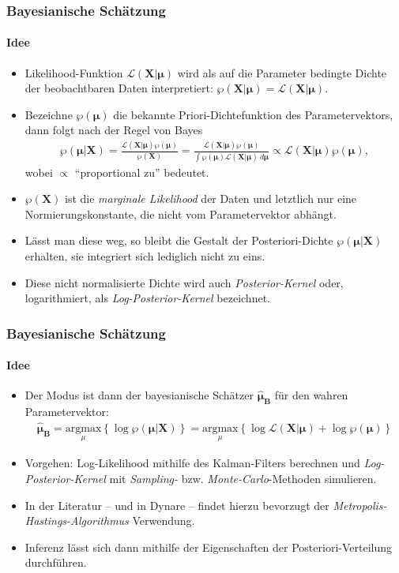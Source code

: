 \documentclass{beamer} %
\begin{document}
\begin{frame}\frametitle{Bayesianische Sch\"{a}tzung}\framesubtitle{Idee}
  \begin{itemize}
     \item Likelihood-Funktion $\mathcal{L}(\mathbf{X}|\boldsymbol{\mu})$ wird als auf die Parameter bedingte Dichte der beobachtbaren Daten interpretiert:
$\wp(\mathbf{X}|\boldsymbol{\mu})=\mathcal{L}(\mathbf{X}|\boldsymbol{\mu})$.
     \item Bezeichne $\wp(\boldsymbol{\mu})$ die bekannte Priori-Dichtefunktion des Parametervektors, dann folgt nach der Regel von Bayes
\begin{align*}
    \wp(\boldsymbol{\mu}|\mathbf{X}) = \frac{\mathcal{L}(\mathbf{X}|\boldsymbol{\mu})\wp(\boldsymbol{\mu})}{\wp(\mathbf{X})} =  \frac{\mathcal{L}(\mathbf{X}|\boldsymbol{\mu})\wp(\boldsymbol{\mu})}{\int \wp(\boldsymbol{\mu}) \mathcal{L}(\mathbf{X|\boldsymbol{\mu}}) ~d\boldsymbol{\mu}} \propto \mathcal{L}(\mathbf{X}|\boldsymbol{\mu})\wp(\boldsymbol{\mu}),
\end{align*}
wobei $\propto$ \enquote{proportional zu} bedeutet.

     \item $\wp(\mathbf{X})$ ist die \emph{marginale Likelihood} der Daten
und letztlich nur eine Normierungskonstante, die nicht vom Parametervektor
abh\"{a}ngt. \item L\"{a}sst man diese weg, so bleibt die Gestalt der Posteriori-Dichte
$\wp(\boldsymbol{\mu}|\mathbf{X})$ erhalten, sie integriert sich lediglich
nicht zu eins. \item Diese nicht normalisierte Dichte wird auch
\emph{Posterior-Kernel} oder, logarithmiert, als \emph{Log-Posterior-Kernel}
bezeichnet.
   \end{itemize}
\end{frame}

\begin{frame}\frametitle{Bayesianische Sch\"{a}tzung}\framesubtitle{Idee}
  \begin{itemize}
    \item Der Modus ist dann der bayesianische Sch\"{a}tzer $\boldsymbol{\widehat{\mu}_B}$ f\"{u}r den wahren Parametervektor:
\begin{align*}
    \boldsymbol{\widehat{\mu}_B} = \underset{\mu}{\text{argmax}}\left\{\log{\wp(\boldsymbol{\mu}|\mathbf{X})}\right\} = \underset{\mu}{\text{argmax}}\left\{ \log{\mathcal{L}(\mathbf{X}|\boldsymbol{\mu})} + \log{\wp(\boldsymbol{\mu})} \right\}
\end{align*}
    \item Vorgehen: Log-Likelihood mithilfe des Kalman-Filters berechnen und \emph{Log-Posterior-Kernel} mit \emph{Sampling-} bzw. \emph{Monte-Carlo}-Methoden simulieren.
    \item  In der Literatur -- und in Dynare -- findet hierzu bevorzugt der \emph{Metropolis-Hastings-Algorithmus} Verwendung.
    \item  Inferenz l\"{a}sst sich dann mithilfe der Eigenschaften der Posteriori-Verteilung durchf\"{u}hren.
  \end{itemize}
\end{frame}
\end{document}
